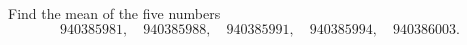 Find the mean of the five numbers
\[940385981,\quad940385988,\quad940385991,\quad940385994,\quad940386003.\]
